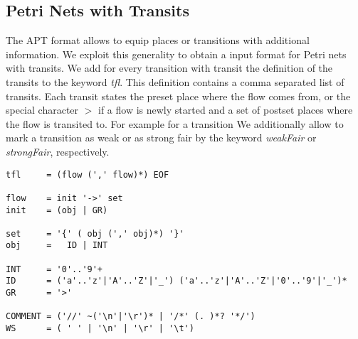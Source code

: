 \documentclass[12pt,twoside,a4paper,openright]{memoir}
\begin{document}
\subsection{Petri Nets with Transits}
\label{sec:format_pnwt}
The APT format allows to equip places or transitions with additional information.
We exploit this generality to obtain a input format for Petri nets with transits.
We add for every transition with transit the definition of the transits to the keyword \emph{tfl}.
This definition contains a comma separated list of transits.
Each transit states the preset place where the flow comes from, or the special character \(>\) if a flow is newly
started and a set of postset places where the flow is transited to.
For example for a transition 
We additionally allow to mark a transition as weak or as strong fair by the keyword \emph{weakFair} or \emph{strongFair}, respectively.
\begin{lstlisting}[captionpos=b, caption=Grammar for the Transit Relation of Petri Nets with Transit, label = lst:grammar,language=ebnf]
tfl		= (flow (',' flow)*) EOF

flow  	= init '->' set
init  	= (obj | GR)

set		= '{' ( obj (',' obj)*) '}'
obj		=	ID | INT

INT 	= '0'..'9'+
ID  	= ('a'..'z'|'A'..'Z'|'_') ('a'..'z'|'A'..'Z'|'0'..'9'|'_')*
GR  	= '>'

COMMENT	= ('//' ~('\n'|'\r')* | '/*' (. )*? '*/')
WS		= ( ' ' | '\n' | '\r' | '\t')
\end{lstlisting}
\end{document}

